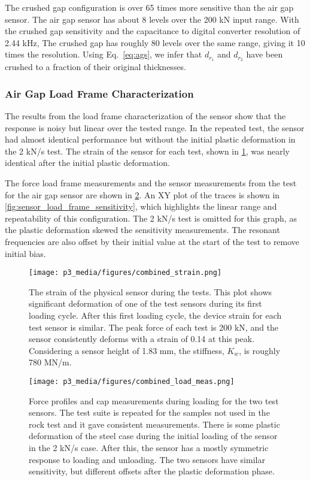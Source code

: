 The crushed gap configuration is over 65 times more sensitive than the air gap sensor.
The air gap sensor has about 8 levels over the 200 kN input range.
With the crushed gap sensitivity and the capacitance to digital converter resolution of 2.44 kHz,
The crushed gap has roughly 80 levels over the same range, giving it 10 times the resolution.
Using Eq.~\ref{eq:ags}, 
we infer that $d_{r_1}$ and $d_{r_2}$ have been crushed to a fraction of their original thicknesses.

\subsubsection{Air Gap Load Frame Characterization}

The results from the load frame characterization of the sensor show that 
the response is noisy but linear over the tested range. 
In the repeated test, the sensor had almost identical performance but 
without the initial plastic deformation in the 2 kN/s test. 
The strain of the sensor for each test, shown in \ref{fig:sensor_load_frame_strain},
was nearly identical after the initial plastic deformation.

The force load frame measurements and the sensor measurements 
from the test for the air gap sensor are shown in \ref{fig:sensor_load_frame}.
An XY plot of the traces is shown in \ref{fig:sensor_load_frame_sensitivity}, 
which highlights the linear range and
repeatability of this configuration. 
The 2 kN/s test is omitted for this graph, as the plastic deformation skewed the sensitivity measurements.
The resonant frequencies are also offset by their initial value at the start of the test
to remove initial bias.

\begin{figure}[ht]
\centering
\texttt{[image: p3\_media/figures/combined\_strain.png]}
\caption{The strain of the physical sensor during the tests. 
This plot shows significant deformation of one of the test sensors during its first loading cycle.
After this first loading cycle, the device strain for each test sensor is similar.
The peak force of each test is 200 kN, and the sensor 
consistently deforms with a strain of 0.14 at this peak.
Considering a sensor height of 1.83 mm, the stiffness, $K_w$, is roughly 780 MN/m.
}
\label{fig:sensor_load_frame_strain}
\end{figure}

\begin{figure}[h]
\centering
\texttt{[image: p3\_media/figures/combined\_load\_meas.png]}
\caption{Force profiles and cap measurements during loading for the two test sensors. 
The test suite is repeated for the samples not used in the rock test and it gave consistent measurements.
There is some plastic deformation of the steel case during the initial loading of the sensor
in the 2 kN/s case. After this, the sensor has a mostly symmetric response to loading and unloading.
The two sensors have similar sensitivity, but different offsets after the plastic deformation phase.}
\label{fig:sensor_load_frame}
\end{figure}

